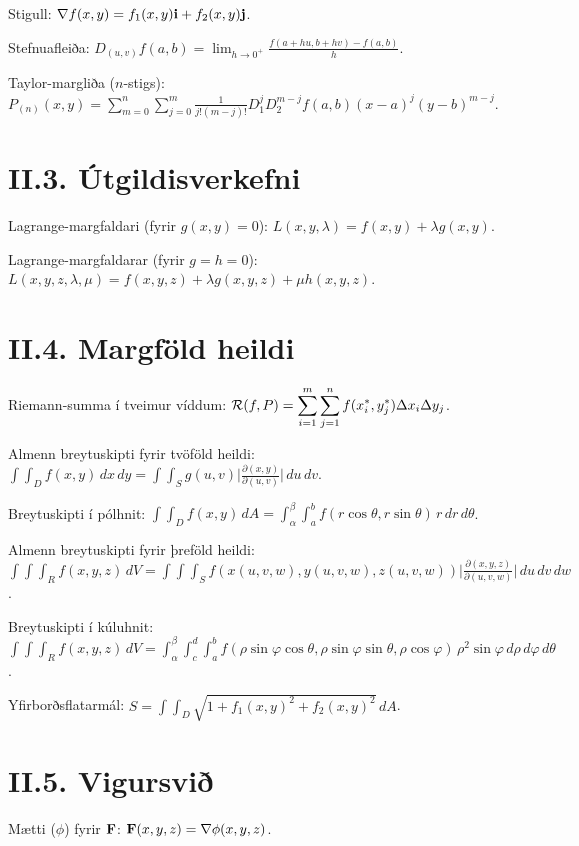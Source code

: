 Stigull: $\displaystyle \nabla f(x,y)=f_1(x,y)\mbox{${\bf i}$}+f_2(x,y)\mbox{${\bf j}$}$.

Stefnuafleiða: $\displaystyle D_{(u,v)}f(a,b)=\lim_{h\rightarrow 0^+}\frac{f(a+hu, b+hv)-f(a,b)}{h}$.

Taylor-margliða ($n$-stigs): $\displaystyle P_{(n)}(x,y) 
=\sum_{m=0}^n\sum_{j=0}^m \frac{1}{j!(m-j)!}
D_1^jD_2^{m-j}f(a,b)(x-a)^j(y-b)^{m-j}$.

\section*{II.3. Útgildisverkefni}
Lagrange-margfaldari (fyrir $g(x,y)=0$): $L(x,y,\lambda) = f(x,y) + \lambda g(x,y)$.

Lagrange-margfaldarar (fyrir $g=h=0$): $L(x,y,z,\lambda,\mu) = f(x,y,z) + \lambda g(x,y,z) + \mu h(x,y,z)$.

\section*{II.4. Margföld heildi}
Riemann-summa í tveimur víddum: $\displaystyle\\\mathcal{R}(f,P)=\sum_{i=1}^m\sum_{j=1}^n f(x_i^*, y_j^*)\Delta x_i\Delta
	y_j$.

Almenn breytuskipti fyrir tvöföld heildi: $\displaystyle \int\!\!\!\int_D f(x,y)\,dx\,dy=\int\!\!\!\int_S g(u,v)
\bigg|\frac{\partial(x,y)}{\partial(u,v)}\bigg|\,du\,dv$.

Breytuskipti í pólhnit: $\displaystyle \int\!\!\!\int_D f(x,y)\,dA=\int_\alpha^\beta\!\!\!\int_{a}^{b}
f(r\cos\theta,r\sin\theta)\,r\,dr\, d\theta$.

Almenn breytuskipti fyrir þreföld heildi:\\ $\displaystyle 
\int\!\!\!\int\!\!\!\int_R f(x,y,z)\,dV =\int\!\!\!\int\!\!\!\int_S f(x(u,v,w), y(u,v,w), z(u,v,w))
\bigg|\frac{\partial(x,y,z)}{\partial(u,v,w)}\bigg|\,du\,dv\,dw$.

Breytuskipti í kúluhnit:\\ 
$\displaystyle \int\!\!\!\int\!\!\!\int_R f(x,y,z)\,dV= \int_\alpha^\beta\!\int_c^d\!\int_a^b f(\rho\sin\varphi\cos\theta, \rho\sin\varphi\sin\theta,\rho\cos\varphi)
\,\rho^2\sin\varphi\,d\rho\,d\varphi\,d\theta$.


Yfirborðsflatarmál: $\displaystyle S=\int\!\!\!\int_D \sqrt{1+f_1(x,y)^2+f_2(x,y)^2}\,dA$.

\section*{II.5. Vigursvið}
Mætti ($\phi$) fyrir $\mbox{${\bf F}$}$: $\mbox{${\bf F}$}(x,y,z) = \nabla \phi(x,y,z)$.

